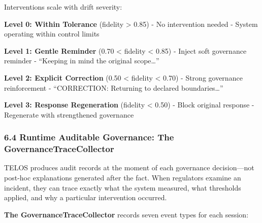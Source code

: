 Interventions scale with drift severity:

\textbf{Level 0: Within Tolerance} (fidelity \textgreater{} 0.85) - No
intervention needed - System operating within control limits

\textbf{Level 1: Gentle Reminder} (0.70 \textless{} fidelity \textless{}
0.85) - Inject soft governance reminder - ``Keeping in mind the original
scope\ldots{}''

\textbf{Level 2: Explicit Correction} (0.50 \textless{} fidelity
\textless{} 0.70) - Strong governance reinforcement - ``CORRECTION:
Returning to declared boundaries\ldots{}''

\textbf{Level 3: Response Regeneration} (fidelity \textless{} 0.50) -
Block original response - Regenerate with strengthened governance

\subsubsection{6.4 Runtime Auditable Governance: The
GovernanceTraceCollector}\label{runtime-auditable-governance-the-governancetracecollector}

TELOS produces audit records at the moment of each governance
decision---not post-hoc explanations generated after the fact. When
regulators examine an incident, they can trace exactly what the system
measured, what thresholds applied, and why a particular intervention
occurred.

\textbf{The GovernanceTraceCollector} records seven event types for each
session:

